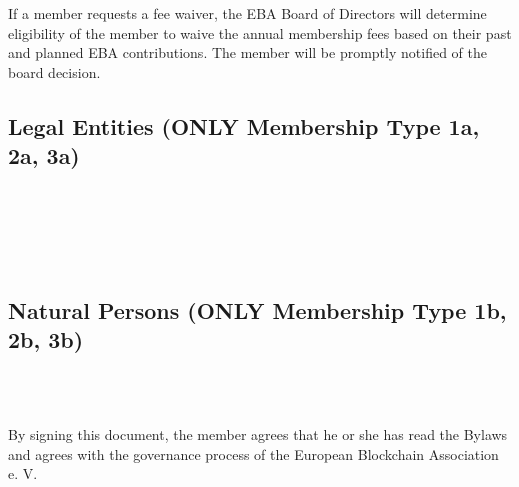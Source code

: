 \documentclass{article}
\begin{document}
If a member requests a fee waiver, the EBA Board of Directors will determine eligibility of the member to waive the annual membership fees based on their past and planned EBA contributions. The member will be promptly notified of the board decision.

\newpage

\begin{Form}
	\section*{Legal Entities (ONLY Membership Type 1a, 2a, 3a)} 
	
	\sbox{}%
	\\[1ex] \\
	\sbox{}%
	\\[1ex] \\
    
\end{Form}

\begin{Form}
	\section*{Natural Persons (ONLY Membership Type 1b, 2b, 3b)} 
	
	\sbox{}%
	\\[1ex] \\
        
\end{Form}

\vspace{4cm}

By signing this document, the member agrees that he or she has read the Bylaws and agrees with the governance process of the European Blockchain Association e. V.

\vspace{5cm}

 
\end{document}
